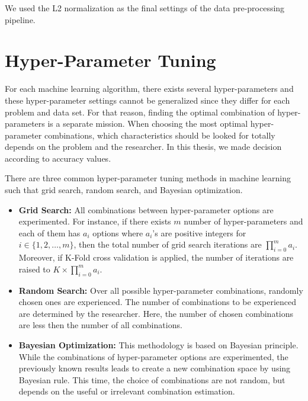We used the L2 normalization as the final settings of the data pre-processing pipeline.

\section{Hyper-Parameter Tuning}

For each machine learning algorithm, there exists several hyper-parameters and these hyper-parameter settings cannot be generalized since they differ for each problem and data set. For that reason, finding the optimal combination of hyper-parameters is a separate mission. When choosing the most optimal hyper-parameter combinations, which characteristics should be looked for totally depends on the problem and the researcher. In this thesis, we made decision according to accuracy values.

There are three common hyper-parameter tuning methods in machine learning such that grid search, random search, and Bayesian optimization.

\begin{itemize}
    
    \item \textbf{Grid Search:} All combinations between hyper-parameter options are experimented. For instance, if there exists $m$ number of hyper-parameters and each of them has $a_{i}$ options where $a_{i}$'s are positive integers for $i \in \{1,2,\dots,m\}$, then the total number of grid search iterations are $\prod_{i=0}^{m} a_{i}$. Moreover, if K-Fold cross validation is applied, the number of iterations are raised to $K \times \prod_{i=0}^{m} a_{i}$.
    
    \item \textbf{Random Search:} Over all possible hyper-parameter combinations, randomly chosen ones are experienced. The number of combinations to be experienced are determined by the researcher. Here, the number of chosen combinations are less then the number of all combinations.
    
    \item \textbf{Bayesian Optimization:} This methodology is based on Bayesian principle. While the combinations of hyper-parameter options are experimented, the previously known results leads to create a new combination space by using Bayesian rule. This time, the choice of combinations are not random, but depends on the useful or irrelevant combination estimation.
    
\end{itemize}

